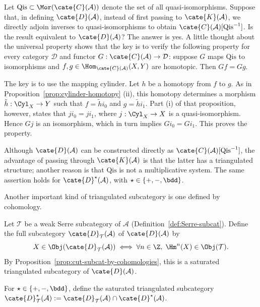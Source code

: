 \begin{remark}
	Let $\mathrm{Qis} \subset \Mor(\cate{C}(\mathcal{A}))$ denote the set of
	all quasi-isomorphisms. Suppose that, in defining
	$\cate{D}(\mathcal{A})$, instead of first passing to
	$\cate{K}(\mathcal{A})$, we directly adjoin inverses to
	quasi-isomorphisms to obtain
	$\cate{C}(\mathcal{A})[\mathrm{Qis}^{-1}]$. Is the result equivalent to
	$\cate{D}(\mathcal{A})$? The answer is yes. A little thought about the
	universal property shows that the key is to verify the following property
	for every category $\mathcal{D}$ and functor
	$G: \cate{C}(\mathcal{A}) \to \mathcal{D}$: suppose $G$ maps
	$\mathrm{Qis}$ to isomorphisms and
	$f, g \in \Hom_{\cate{C}(\mathcal{A})}(X, Y)$ are homotopic. Then
	$Gf = Gg$.

	The key is to use the mapping cylinder. Let $h$ be a homotopy from $f$ to
	$g$. As in Proposition~\ref{prop:cylinder-homotopy} (ii), this homotopy
	determines a morphism $\tilde{h}: \Cyl_X \to Y$ such that
	$f = \tilde{h} i_0$ and $g = \tilde{h} i_1$. Part (i) of that
	proposition, however, states that $j i_0 = j i_1$, where
	$j: \Cyl_X \to X$ is a quasi-isomorphism. Hence $Gj$ is an isomorphism,
	which in turn implies $G i_0 = G i_1$. This proves the property.

	Although $\cate{D}(\mathcal{A})$ can be constructed directly as
	$\cate{C}(\mathcal{A})[\mathrm{Qis}^{-1}]$, the advantage of passing
	through $\cate{K}(\mathcal{A})$ is that the latter has a triangulated
	structure; another reason is that $\mathrm{Qis}$ is not a multiplicative
	system. The same assertion holds for $\cate{D}^\star(\mathcal{A})$, with
	$\star \in \{+, -, \bdd\}$.
\end{remark}

Another important kind of triangulated subcategory is one defined by
cohomology.

\begin{definition}
	Let $\mathcal{T}$ be a weak Serre subcategory of $\mathcal{A}$
	(Definition~\ref{def:Serre-subcat}). Define the full subcategory
	$\cate{D}_{\mathcal{T}}(\mathcal{A})$ of $\cate{D}(\mathcal{A})$ by
	\[ X \in \Obj(\cate{D}_{\mathcal{T}}(\mathcal{A})) \iff \forall n \in \Z, \; \Hm^n(X) \in \Obj(\mathcal{T}). \]
	By Proposition~\ref{prop:cut-subcat-by-cohomologies}, this is a saturated
	triangulated subcategory of $\cate{D}(\mathcal{A})$.

	For $\star \in \{+, -, \bdd\}$, define the saturated triangulated
	subcategory
	$\cate{D}^\star_{\mathcal{T}}(\mathcal{A}) :=
	\cate{D}_{\mathcal{T}}(\mathcal{A}) \cap
	\cate{D}^\star(\mathcal{A})$.
\end{definition}

